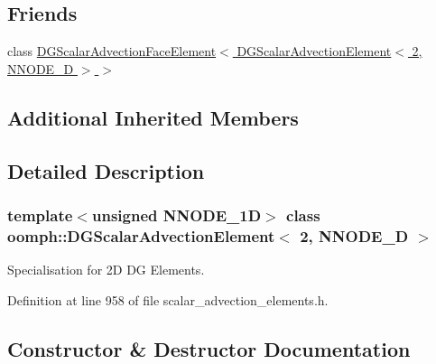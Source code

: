 \subsection*{Friends}
\begin{DoxyCompactItemize}
\item 
class \hyperlink{classoomph_1_1DGScalarAdvectionElement_3_012_00_01NNODE__1D_01_4_af13f4a07a9d3c67e1394f8154e6ddc71}{D\+G\+Scalar\+Advection\+Face\+Element$<$ D\+G\+Scalar\+Advection\+Element$<$ 2, N\+N\+O\+D\+E\+\_\+D $>$ $>$}
\end{DoxyCompactItemize}
\subsection*{Additional Inherited Members}


\subsection{Detailed Description}
\subsubsection*{template$<$unsigned N\+N\+O\+D\+E\+\_\+1D$>$\newline
class oomph\+::\+D\+G\+Scalar\+Advection\+Element$<$ 2, N\+N\+O\+D\+E\+\_\+D $>$}

Specialisation for 2D DG Elements. 

Definition at line 958 of file scalar\+\_\+advection\+\_\+elements.\+h.



\subsection{Constructor \& Destructor Documentation}
\mbox{\label{classoomph_1_1DGScalarAdvectionElement_3_012_00_01NNODE__1D_01_4_a9c47cf7c2c926c1b23a0d5a02ee3b5b9}} 
